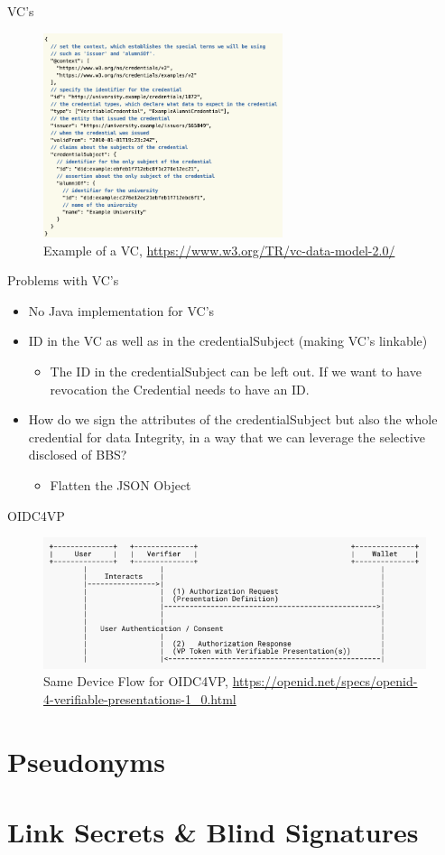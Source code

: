 \documentclass[
	english,%
	authorontitle=true,
	]{bfhbeamer}
\begin{document}
\begin{frame}{VC's}
    \begin{figure}[h]
        \centering
        \includegraphics[width=70mm]{./img/VC_example.png}
        \caption{Example of a VC, \url{https://www.w3.org/TR/vc-data-model-2.0/}}
    \end{figure}
\end{frame}

\begin{frame}{Problems with VC's}
    \begin{itemize}
        \item No Java implementation for VC's
        \item ID in the VC as well as in the credentialSubject (making VC's linkable)
        \begin{itemize}
            \item The ID in the credentialSubject can be left out. If we want to have revocation the Credential needs to have an ID.
        \end{itemize}
        \item How do we sign the attributes of the credentialSubject but also the whole credential for data Integrity, in a way that we can leverage the selective disclosed of BBS?
        \begin{itemize}
            \item Flatten the JSON Object
        \end{itemize}
    \end{itemize}
\end{frame}

\begin{frame}{OIDC4VP}
    \begin{figure}[h]
        \centering
        \includegraphics[width=120mm]{./img/OIDC4VP.png}
        \caption{Same Device Flow for OIDC4VP, \url{https://openid.net/specs/openid-4-verifiable-presentations-1_0.html}}
    \end{figure}
\end{frame}

\section{Pseudonyms}

\section{Link Secrets \& Blind Signatures}
\end{document}
